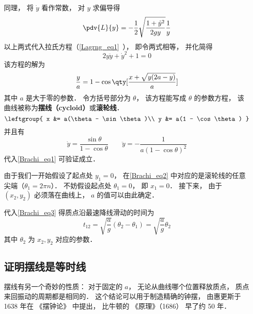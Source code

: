 同理， 将 $\dot y$ 看作常数， 对 $y$ 求偏导得
\begin{equation}
\pdv{L}{y} = -\frac{1}{2} \sqrt{\frac{1 + \dot{y}^2}{2gy}} \frac{1}{y}
\end{equation}
以上两式代入拉氏方程（\autoref{Lagrng_eq1}~）， 即令两式相等， 并化简得
\begin{equation}\label{Brachi_eq1}
2y\ddot y + \dot y^2 + 1 = 0
\end{equation}
该方程的解为
\begin{equation}
\frac{y}{a} = 1 - \cos\qty[\frac{x + \sqrt{y(2a-y)}}{a}]
\end{equation}
其中 $a$ 是大于零的参数． 令方括号部分为 $\theta$， 该方程能写成 $\theta$ 的参数方程， 该曲线被称为\textbf{摆线（cycloid）}或\textbf{滚轮线}． %
\begin{equation}\label{Brachi_eq2}
\leftgroup{
x &= a(\theta - \sin\theta)\\
y &= a(1 - \cos\theta)
}\end{equation}
并且有
\begin{equation}
\dot y = \frac{\sin\theta}{1 - \cos\theta} \qquad
\ddot y = -\frac{1}{a(1-\cos\theta)^2}
\end{equation}
代入\autoref{Brachi_eq1} 可验证成立．

由于我们一开始假设了起点处 $y_1 = 0$， 在\autoref{Brachi_eq2} 中对应的是滚轮线的任意尖端（$\theta_1 = 2\pi n$）． 不妨假设起点处 $\theta_1 = 0$， 即 $x_1 = 0$． 接下来， 由于 $(x_2, y_2)$ 必须落在曲线上，  $a$ 的值可以由此确定．

代入\autoref{Brachi_eq3} 得质点沿最速降线滑动的时间为
\begin{equation}\label{Brachi_eq4}
t_{12} = \sqrt{\frac{a}{g}}(\theta_2 - \theta_1) = \sqrt{\frac{a}{g}} \theta_2
\end{equation}
其中 $\theta_2$ 为 $x_2, y_2$ 对应的参数．


\subsection{证明摆线是等时线}
摆线有另一个奇妙的性质： 对于固定的 $a$， 无论从曲线哪个位置释放质点， 质点来回振动的周期都是相同的． 这个结论可以用于制造精确的钟摆， 由惠更斯于 1638 年在 《摆钟论》 中提出， 比牛顿的 《原理》（1686） 早了约 50 年．

